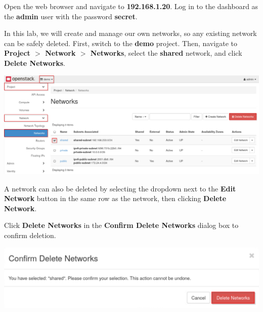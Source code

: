 \documentclass[letterpaper, 12pt]{article}
\begin{document}
\begin{enumerate}
    \begin{labstep}
        Open the web browser and navigate to \textbf{192.168.1.20}.
        Log in to the dashboard as the \textbf{admin} user with the password \textbf{secret}.
    \end{labstep}

    \begin{labstep}
        In this lab, we will create and manage our own networks, so any existing network can be safely deleted.
        First, switch to the \textbf{demo} project.
        Then, navigate to \textbf{Project $>$ Network $>$ Networks}, select the \textbf{shared} network, and click \textbf{Delete Networks}.

        \begin{center}
            \includegraphics[width=\linewidth]{images/part3/step2.png}
        \end{center}
    \end{labstep}

    \begin{tipbox}
        A network can also be deleted by selecting the dropdown next to the \textbf{Edit Network} button in the same row as the network, then clicking \textbf{Delete Network}.
    \end{tipbox}

    \begin{labstep}
        Click \textbf{Delete Networks} in the \textbf{Confirm Delete Networks} dialog box to confirm deletion.

        \begin{center}
            \includegraphics[width=\linewidth]{images/part3/step3.png}
        \end{center}
    \end{labstep}


\end{enumerate}
\end{document}

